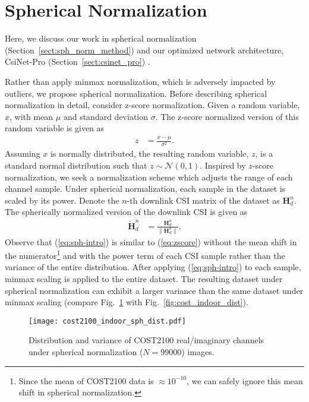 \section{Spherical Normalization} \label{sect:sph_norm}

Here, we discuss our work in spherical normalization (Section~\ref{sect:sph_norm_method}) and our optimized network architecture, CsiNet-Pro (Section~\ref{sect:csinet_pro}) \cite{ref:liu2020sphnet}.

\label{sect:sph_norm_method}
Rather than apply minmax normalization, which is adversely impacted by outliers, we propose spherical normalization. Before describing spherical normalization in detail, consider z-score normalization. Given a random variable, $x$, with mean $\mu$ and standard deviation $\sigma$. The z-score normalized version of this random variable is given as
\begin{align}
	z &= \frac{x - \mu}{\sigma^2}. \label{eq:zscore}
\end{align}
Assuming $x$ is normally distributed, the resulting random variable, $z$, is a standard normal distribution such that $z \sim \mathcal N(0,1)$. Inspired by $z$-score normalization, we seek a normalization scheme which adjusts the range of each channel sample. Under spherical normalization, each sample in the dataset is scaled by its power. Denote the $n$-th downlink CSI matrix of the dataset as $\mathbf H_d^n$. The spherically normalized version of the downlink CSI is given as
\begin{align}
	\mathbf{\check H}_d^n &= \frac{\mathbf H_d^n}{\|\mathbf H_d^n\|}. \label{eq:sph-intro}
\end{align}
Observe that (\ref{eq:sph-intro}) is similar to (\ref{eq:zscore}) without the mean shift in the numerator\footnote{Since the mean of COST2100 data is $\approx 10^{-10}$, we can safely ignore this mean shift in spherical normalization.} and with the power term of each CSI sample rather than the variance of the entire distribution. After applying (\ref{eq:sph-intro}) to each sample, minmax scaling is applied to the entire dataset. The resulting dataset under spherical normalization can exhibit a larger variance than the same dataset under minmax scaling (compare Fig.~\ref{fig:cost_indoor_sph_dist} with Fig.~\ref{fig:cost_indoor_dist}). 
\begin{figure}[htb]
	\centering
	\texttt{[image: cost2100\_indoor\_sph\_dist.pdf]}
	\medskip
	\caption{Distribution and variance of COST2100 real/imaginary channels under spherical normalization ($N=99000$) images.}
	\label{fig:cost_indoor_sph_dist}
\end{figure}

